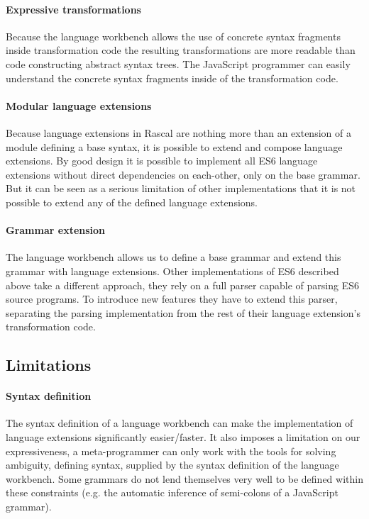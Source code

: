 \paragraph{Expressive transformations}
Because the language workbench allows the use of concrete syntax fragments inside transformation code the resulting transformations are more readable than code constructing abstract syntax trees. The JavaScript programmer can easily understand the concrete syntax fragments inside of the transformation code.

\paragraph{Modular language extensions}
Because language extensions in Rascal are nothing more than an extension of a module defining a base syntax, it is possible to extend and compose language extensions. By good design it is possible to implement all ES6 language extensions without direct dependencies on each-other, only on the base grammar. But it can be seen as a serious limitation of other implementations that it is not possible to extend any of the defined language extensions. 

\paragraph{Grammar extension}
The language workbench allows us to define a base grammar and extend this grammar with language extensions. Other implementations of ES6 described above take a different approach, they rely on a full parser capable of parsing ES6 source programs. To introduce new features they have to extend this parser, separating the parsing implementation from the rest of their language extension's transformation code.

\subsection{Limitations}

\paragraph{Syntax definition}
The syntax definition of a language workbench can make the implementation of language extensions significantly easier/faster. It also imposes a limitation on our expressiveness, a meta-programmer can only work with the tools for solving ambiguity, defining syntax, supplied by the syntax definition of the language workbench. Some grammars do not lend themselves very well to be defined within these constraints (e.g. the automatic inference of semi-colons of a JavaScript grammar).

